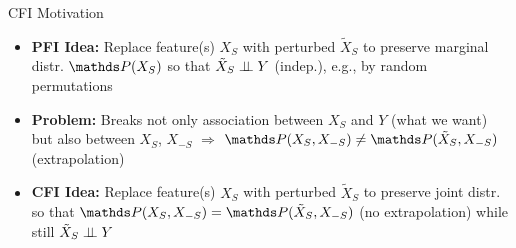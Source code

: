 \documentclass[10pt,compress,t,notes=noshow, xcolor=table]{beamer}
\begin{document}
\begin{frame}{CFI Motivation}

\begin{itemize}[<+->]
    \item \textbf{PFI Idea:} Replace feature(s) $X_S$ with perturbed $\tilde X_S$ to preserve marginal distr. $\P(X_S)$ so that $\tilde X_S \perp \!\!\! \perp Y$ (indep.), e.g., by random permutations
    \item \textbf{Problem:} Breaks not only association between $X_S$ and $Y$ (what we want) but also between $X_S$, $X_{-S}$ $\Rightarrow$ $\P(X_S, X_{-S}) \neq \P(\tilde X_S, X_{-S})$ (extrapolation)
    \item \textbf{CFI Idea:} Replace feature(s) $X_S$ with perturbed $\tilde X_S$ to preserve joint distr. so that $\P(X_S, X_{-S}) = \P(\tilde X_S, X_{-S})$ (no extrapolation) while still $\tilde X_S \perp \!\!\! \perp Y$
\end{itemize}

\medskip

\end{frame}
\end{document}
